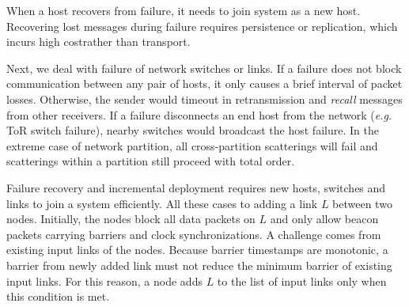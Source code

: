 When a host recovers from failure, it needs to join \sys system as a new host.
Recovering lost messages during failure requires persistence or replication, which incurs high costrather than \sys transport.

Next, we deal with failure of network switches or links.
If a failure does not block communication between any pair of hosts, it only causes a brief interval of packet losses.
Otherwise, the sender would timeout in retransmission and \textit{recall} messages from other receivers.
If a failure disconnects an end host from the network (\textit{e.g.} ToR switch failure), nearby switches would broadcast the host failure.
In the extreme case of network partition, all cross-partition scatterings will fail and scatterings within a partition still proceed with total order.



Failure recovery and incremental deployment requires new hosts, switches and links to join a \sys system efficiently.
All these cases  to adding a link $L$ between two nodes.
Initially, the nodes block all data packets on $L$ and only allow beacon packets carrying barriers and clock synchronizations.
{
A challenge comes from existing input links of the nodes.
Because barrier timestamps are monotonic, a barrier from newly added link must not reduce the minimum barrier of existing input links.
For this reason, a node adds $L$ to the list of input links only when this condition is met.}

